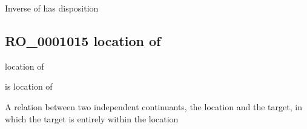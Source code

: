 \documentclass[letterpaper,10pt,english]{sphinxmanual}
\begin{document}
\begin{sphinxShadowBox}

\sphinxAtStartPar
{\hyperref[\detokenize{doc-RO_0000052::doc}]{}}
\end{sphinxShadowBox}

\begin{sphinxShadowBox}

\sphinxAtStartPar
Inverse of has disposition
\end{sphinxShadowBox}

\begin{sphinxShadowBox}

\sphinxAtStartPar
{}
\end{sphinxShadowBox}
\begin{quote}

\ignorespaces \end{quote}


\subsection{RO\_0001015 \sphinxhyphen{} location of}
\label{\detokenize{doc-RO_0001015:ro-0001015-location-of}}\label{\detokenize{doc-RO_0001015:index-0}}\label{\detokenize{doc-RO_0001015::doc}}
\begin{sphinxShadowBox}

\sphinxAtStartPar
location of
\end{sphinxShadowBox}

\begin{sphinxShadowBox}

\sphinxAtStartPar
is location of
\end{sphinxShadowBox}

\begin{sphinxShadowBox}

\sphinxAtStartPar
{}
\end{sphinxShadowBox}

\begin{sphinxShadowBox}

\sphinxAtStartPar
A relation between two independent continuants, the location and the target, in which the target is entirely within the location
\end{sphinxShadowBox}
\end{document}
